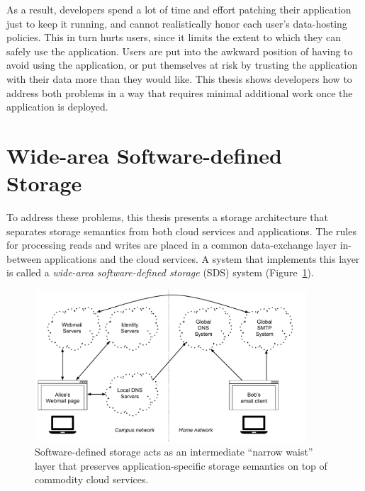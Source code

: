 As a result, developers spend a lot of time and effort patching their
application just to keep it running, and cannot realistically honor
each user's data-hosting policies.  This in turn hurts users, since it
limits the extent to which they can safely use the application.  Users are put
into the awkward position of having to avoid using the application, or put
themselves at risk by trusting the application with their data more than they
would like.  This thesis shows developers how to
address both problems in a way that requires minimal additional work once the
application is deployed.

\section{Wide-area Software-defined Storage}


To address these problems, this thesis presents a 
storage architecture that separates storage semantics
from both cloud services and applications.  The rules for processing reads and writes
are placed in a common data-exchange
layer in-between applications and the cloud services.  A system that
implements this layer is called a \emph{wide-area software-defined storage} (SDS) system
(Figure~\ref{fig:chap1-sds-overview}).

\begin{figure}[h]
   \centering
   \includegraphics[width=0.9\textwidth,page=28]{figures/dissertation-figures}
   \caption{Software-defined storage acts as an intermediate ``narrow waist''
   layer that preserves application-specific storage semantics on top of
   commodity cloud services.}
   \label{fig:chap1-sds-overview}
\end{figure}

